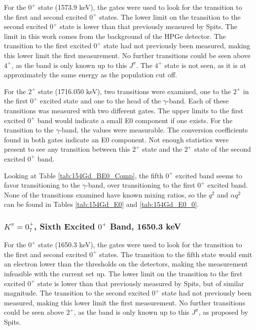 For the $0^+$ state (1573.9 keV), the gates were used to look for the transition to the first and second excited $0^+$ states. The lower limit on the transition to the second excited $0^+$ state is lower than that previously measured by Spits. The limit in this work comes from the background of the HPGe detector.  The transition to the first excited $0^+$ state had not previously been measured, making this lower limit the first measurement. No further transitions could be seen above $4^+$, as the band is only known up to this $J^{\pi}$. The $4^+$ state is not seen, as it is at approximately the same energy as the population cut off.

For the $2^+$ state (1716.050 keV), two transitions were examined, one to the $2^+$ in the first $0^+$ excited state and one to the head of the $\gamma$-band. Each of these transitions was measured with two different gates. The upper limits to the first excited $0^+$ band would indicate a small E0 component if one exists. For the transition to the $\gamma$-band, the values were measurable. The conversion coefficients found in both gates indicate an E0 component. Not enough statistics were present to see any transition between this $2^+$ state and the $2^+$ state of the second excited $0^+$ band.

Looking at Table \ref{tab:154Gd_BE0_Comp}, the fifth $0^+$ excited band seems to favor transitioning to the $\gamma$-band, over transitioning to the first $0^+$ excited band. None of the transitions examined have known mixing ratios, so the $q^2$ and $\alpha q^2$ can be found in Tables \ref{tab:154Gd_E0} and \ref{tab:154Gd_E0_0}. 

\subsubsection{$K^{\pi}=0^+_7$, Sixth Excited $0^+$ Band, 1650.3 keV}

For the $0^+$ state (1650.3 keV), the gates were used to look for the transition to the first and second excited $0^+$ states. The transition to the fifth state would emit an electron lower than the thresholds on the detectors, making the measurement infeasible with the current set up. The lower limit on the transition to the first excited $0^+$ state is lower than that previously measured by Spits, but of similar magnitude. The transition to the second excited $0^+$ state had not previously been measured, making this lower limit the first measurement. No further transitions could be seen above $2^+$, as the band is only known up to this $J^{\pi}$, as proposed by Spits\citep{spits96:_154gd}.

